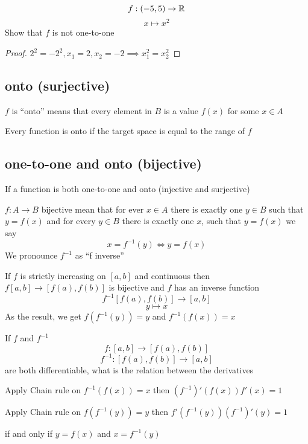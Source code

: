 \begin{example*}
  $$f: (-5, 5) \to \mathbb R$$
  $$x \mapsto x^2$$
  Show that $f$ is not one-to-one
\end{example*}

\begin{proof}
  $2^2 = -2^2, x_1 = 2, x_2 = -2 \implies x_1^2 = x_2^2$
\end{proof}

\subsection{onto (surjective)}
$f$ is ``onto'' means that every element in $B$ is a value $f(x)$ for some $x \in A$

Every function is onto if the target space is equal to the range of $f$

\subsection{one-to-one and onto (bijective)}
If a function is both one-to-one and onto (injective and surjective) 

$f : A \to B$ bijective mean that for ever $x \in A$ there is exactly one $y \in B$ such that $y = f(x)$
and for every $y \in B$ there is exactly one $x$, such that $y = f(x)$
we say $$x = f^{-1}(y) \iff y = f(x)$$
We pronounce $f^{-1}$ as ``f inverse'' 


\begin{theorem*}
  If $f$ is strictly increasing on $[a, b]$ and continuous then $f[a, b] \to [f(a), f(b)]$ is bijective and $f$ has an inverse function
  $$f^{-1}[f(a), f(b)] \to [a, b]$$
  $$y \mapsto x$$
  As the result, we get $f(f^{-1}(y)) = y$ and $f^{-1}(f(x)) = x$
\end{theorem*}


If $f$ and $f^{-1}$
$$f: [a, b] \to [f(a), f(b)]$$
$$f^{-1} : [f(a), f(b)] \to [a, b]$$
are both differentiable, what is the relation between the derivatives

Apply Chain rule on $f^{-1}(f(x)) = x$ then $(f^{-1})'(f(x))f'(x) = 1$

Apply Chain rule on $f(f^{-1}(y)) = y$ then $f'(f^{-1}(y))(f^{-1})'(y) = 1$

if and only if $y = f(x)$ and $x = f^{-1}(y)$

